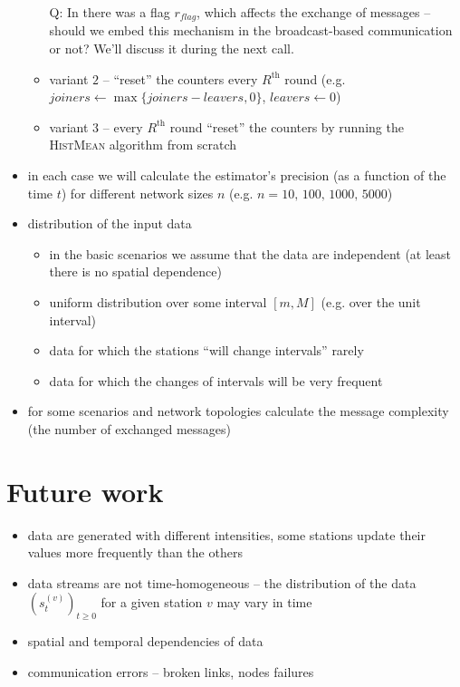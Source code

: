 \documentclass[a4paper, 12pt]{article}
\begin{document}
\begin{itemize}
\begin{itemize}
				Q: In \cite{Nugroho:2020:AveragingTS} there was a flag $r_{flag}$, which affects the exchange of messages -- should we embed this mechanism in the
				broadcast-based communication or not? We'll discuss it during the next call.
			\item variant $2$ -- ``reset'' the counters every $R^{\text{th}}$ round (e.g. $joiners \gets \max\{joiners - leavers,0\}$, $leavers \gets 0$)
			\item variant $3$ -- every $R^{\text{th}}$ round ``reset'' the counters by running the \textsc{HistMean} algorithm from scratch
		\end{itemize}
	\item in each case we will calculate the estimator's precision (as a function of the time $t$) for different network sizes $n$ (e.g. $n = 10,\,100,\,1000,\,5000$)
	\item distribution of the input data
		\begin{itemize}
			\item in the basic scenarios we assume that the data are independent (at least there is no spatial dependence)
			\item uniform distribution over some interval $[m, M]$ (e.g. over the unit interval)
			\item data for which the stations ``will change intervals'' rarely
			\item data for which the changes of intervals will be very frequent
		\end{itemize}
	\item for some scenarios and network topologies calculate the message complexity (the number of exchanged messages)
\end{itemize}

\section*{Future work}
\begin{itemize}
	\item data are generated with different intensities, some stations update their values more frequently than the others
	\item data streams are not time-homogeneous -- the distribution of the data $(s^{(v)}_t)_{t \geq 0}$ for a given station $v$ may vary in time
	\item spatial and temporal dependencies of data
	\item communication errors -- broken links, nodes failures
\end{itemize}



\end{document}
